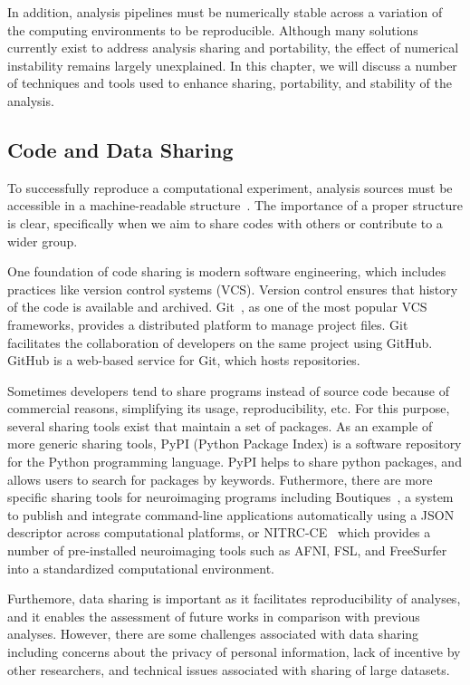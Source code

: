 In addition, analysis pipelines must be numerically stable across a 
variation of the computing environments to be reproducible. Although 
many solutions currently exist to address analysis sharing and 
portability, the effect of numerical instability remains largely 
unexplained. In this chapter, we will discuss a number of techniques 
and tools used to enhance sharing, portability, and stability of the 
analysis.


\subsection{Code and Data Sharing}

To successfully reproduce a computational experiment, analysis sources 
must be accessible in a machine-readable 
structure~\cite{stodden2016enhancing,hasham2018cloud}. The importance 
of a proper structure is clear, specifically when we aim to share 
codes with others or contribute to a wider group.

One foundation of code sharing is modern software engineering, which 
includes practices like version control systems (VCS). Version control 
ensures that history of the code is available and archived. 
Git~\cite{git}, as one of the most popular VCS frameworks, provides a 
distributed platform to manage project files. Git facilitates the 
collaboration of developers on the same project using GitHub. GitHub is 
a web-based service for Git, which hosts repositories. 

Sometimes developers tend to share programs instead of source code 
because of commercial reasons, simplifying its usage, reproducibility, 
etc. For this purpose, several sharing tools exist that maintain a set 
of packages. As an example of more generic sharing tools, PyPI (Python 
Package Index) is a software repository for the Python programming 
language. PyPI helps to share python packages, and allows users to 
search for packages by keywords. Futhermore, there are more specific 
sharing tools for neuroimaging programs including 
Boutiques~\cite{glatard2017boutiques}, a system to publish and 
integrate command-line applications automatically using a JSON 
descriptor across computational platforms, or 
NITRC-CE~\cite{kennedy2016nitrc} which provides a number of 
pre-installed neuroimaging tools such as AFNI, FSL, and FreeSurfer into 
a standardized computational environment. 

Furthemore, data sharing is important as it facilitates reproducibility 
of analyses, and it enables the assessment of future works in 
comparison with previous analyses. However, there are some challenges 
associated with data sharing including concerns about the privacy of 
personal information, lack of incentive by other researchers, and 
technical issues associated with sharing of large datasets. 

